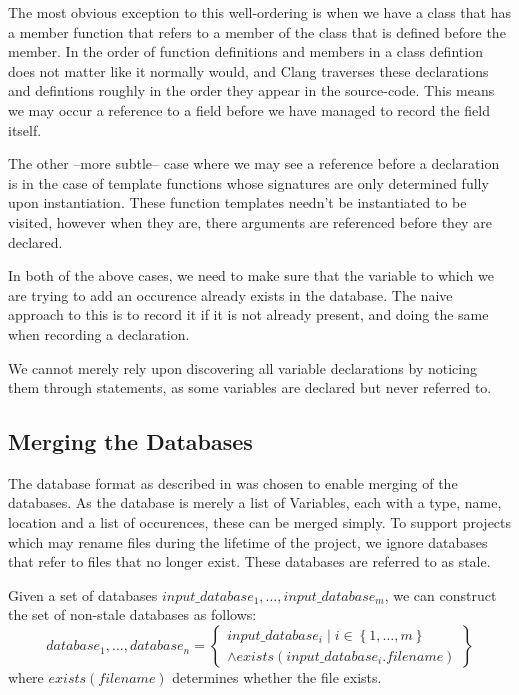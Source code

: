 The most obvious exception to this well-ordering is when we have a class that
has a member function that refers to a member of the class that is defined
before the member. In \CC{} the order of function definitions and members in a
class defintion does not matter like it normally would, and Clang traverses
these declarations and defintions roughly in the order they appear in the
source-code. This means we may occur a reference to a field before we have
managed to record the field itself.

The other --more subtle-- case where we may see a reference before a declaration
is in the case of template functions whose signatures are only determined fully
upon instantiation. These function templates needn't be instantiated to be
visited, however when they are, there arguments are referenced before they are
declared.

In both of the above cases, we need to make sure that the variable to which we
are trying to add an occurence already exists in the database. The naive
approach to this is to record it if it is not already present, and doing the
same when recording a declaration.

We cannot merely rely upon discovering all variable declarations by noticing
them through statements, as some variables are declared but never referred to.

\subsection{Merging the Databases}
\label{sec:dbmerge}

The database format as described in  was chosen to enable
merging of the databases.
As the database is merely a list of Variables, each with a type, name, location
and a list of occurences, these can be merged simply.
To support projects which may rename files during the lifetime of the project,
we ignore databases that refer to files that no longer exist. These databases
are referred to as stale.

Given a set of databases $input\_database_1, \ldots, input\_database_m$, we can
construct the set of non-stale databases as follows:
\begin{equation}
	database_1, \ldots, database_n = \left \{
		\substack {
			input\_database_i \mid i \in \left \{ 1, \ldots, m \right \} \\
			\land exists(input\_database_i.filename)
		}
	\right \}
\end{equation}
where $exists(filename)$ determines whether the file exists.

